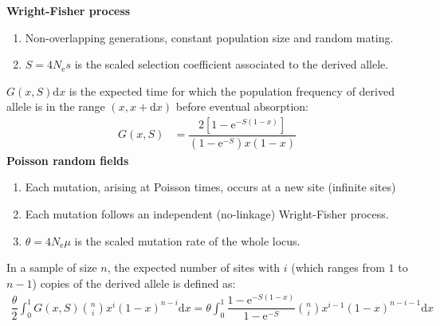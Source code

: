\documentclass[8pt]{beamer}
\newcommand{\e}{\mathrm{e}}
\newcommand{\der}{\mathrm{d}}
\newcommand{\Ne}{N_\mathrm{e}}
\begin{document}
		\begin{frame}
		\textbf{\large Wright-Fisher process}
		\begin{enumerate}
			\item Non-overlapping generations, constant population size and random mating.
			\item $S=4 \Ne s$ is the scaled selection coefficient associated to the derived allele.
		\end{enumerate}
		$G(x, S) \der x $ is the expected time for which the population frequency of derived allele is in the range $(x, x+\der x)$ before eventual absorption:
		\begin{align*}
			G(x, S) & = \dfrac{2 \left[ 1 - \e^{-S(1-x)}\right]}{(1 - \e^{-S})x(1-x)}
		\end{align*}
		\textbf{\large Poisson random fields}
		\begin{enumerate}
			\item Each mutation, arising at Poisson times, occurs at a new site (infinite sites)
			\item Each mutation follows an independent (no-linkage) Wright-Fisher process.
			\item $\theta = 4 \Ne \mu $ is the scaled mutation rate of the whole locus.
		\end{enumerate}
		In a sample of size $n$, the expected number of sites with $i$ (which ranges from $1$ to $n-1$) copies of the derived allele is defined as:
		\begin{align*}
		 \dfrac{\theta}{2} \int_{0}^{1} G(x, S) \binom{n}{i} x^{i} (1-x)^{n-i} \der x 	=  \theta \int_{0}^{1} \dfrac{ 1 - \e^{-S(1-x)}}{1 - \e^{-S}} \binom{n}{i} x^{i-1} (1-x)^{n-i-1} \der x
		\end{align*}
	\end{frame}
\end{document}
